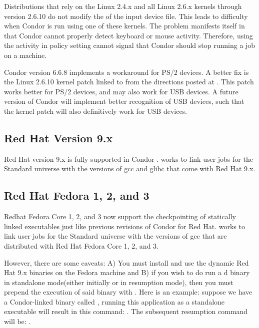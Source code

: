 Distributions that rely on the Linux 2.4.x and all Linux 2.6.x kernels
through version 2.6.10
do not modify the  of the input device file.
This leads to difficulty when Condor is run using one of these
kernels. 
The problem manifests itself in that Condor cannot properly
detect keyboard or mouse activity.
Therefore, using the activity in policy setting cannot
signal that Condor should stop running a job on a machine.

Condor version 6.6.8 implements a workaround for PS/2 devices.
A better fix is the Linux 2.6.10 kernel
patch linked to from the directions posted at
.
This patch works better for PS/2 devices, and
may also work for USB devices.
A future version of Condor will implement better recognition
of USB devices,
such that the kernel patch will also definitively work for USB devices.

\subsection{\label{sec:platform-linux-rh9}Red Hat Version 9.x}

Red Hat version 9.x is fully supported in Condor \VersionNotice.
 works to link user jobs for the Standard universe
with the versions of gcc and glibc that come with Red Hat 9.x.

\subsection{\label{sec:platform-linux-fed}Red Hat Fedora 1, 2, and 3}

Redhat Fedora Core 1, 2, and 3 now support the checkpointing of statically
linked executables just like previous revisions of Condor for Red Hat.
 works to link user jobs for the Standard universe with
the versions of gcc that are distributed with Red Hat Fedora Core 1, 2,
and 3.

However, there are some caveats: A) You must install and use the dynamic
Red Hat 9.x binaries on the Fedora machine and B) if you wish to do
run a d binary in standalone mode(either initially
or in resumption mode), then you must prepend the execution of said
binary with . Here is an example: suppose we have a
Condor-linked binary called , running this application as a
standalone executable will result in this command: . The subsequent resumption command will be: 
.

